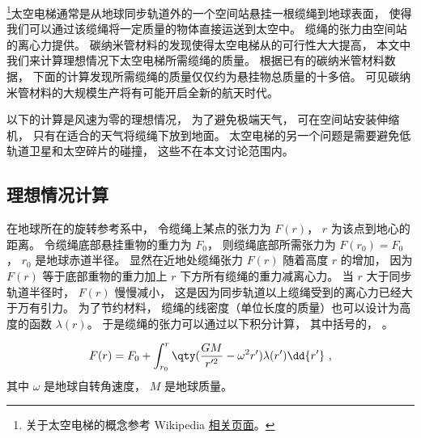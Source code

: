 

\footnote{关于太空电梯的概念参考 Wikipedia \href{https://en.wikipedia.org/wiki/Space_elevator}{相关页面}。}太空电梯通常是从地球同步轨道外的一个空间站悬挂一根缆绳到地球表面， 使得我们可以通过该缆绳将一定质量的物体直接运送到太空中。 缆绳的张力由空间站的离心力提供。 碳纳米管材料的发现使得太空电梯从的可行性大大提高， 本文中我们来计算理想情况下太空电梯所需缆绳的质量。 根据已有的碳纳米管材料数据， 下面的计算发现所需缆绳的质量仅仅约为悬挂物总质量的十多倍。 可见碳纳米管材料的大规模生产将有可能开启全新的航天时代。

以下的计算是风速为零的理想情况， 为了避免极端天气， 可在空间站安装伸缩机， 只有在适合的天气将缆绳下放到地面。 太空电梯的另一个问题是需要避免低轨道卫星和太空碎片的碰撞， 这些不在本文讨论范围内。

\subsection{理想情况计算}
在地球所在的旋转参考系中， 令缆绳上某点的张力为 $F(r)$， $r$ 为该点到地心的距离。 令缆绳底部悬挂重物的重力为 $F_0$， 则缆绳底部所需张力为 $F(r_0) = F_0$， $r_0$ 是地球赤道半径。 显然在近地处缆绳张力 $F(r)$ 随着高度 $r$ 的增加， 因为 $F(r)$ 等于底部重物的重力加上 $r$ 下方所有缆绳的重力减离心力。 当 $r$ 大于同步轨道半径时， $F(r)$ 慢慢减小， 这是因为同步轨道以上缆绳受到的离心力已经大于万有引力。 为了节约材料， 缆绳的线密度（单位长度的质量）也可以设计为高度的函数 $\lambda(r)$。 于是缆绳的张力可以通过以下积分计算， 其中括号的， 。

\begin{equation}\label{eq_SpcLad_1}
F(r) = F_0 + \int_{r_0}^{r} \qty(\frac{GM}{r'^2} - \omega^2 r') \lambda(r') \dd{r'}~,
\end{equation}
其中 $\omega$ 是地球自转角速度， $M$ 是地球质量。


